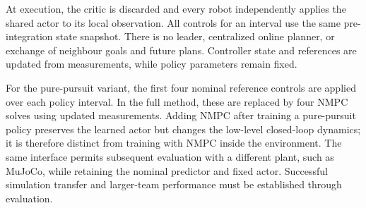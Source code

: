 At execution, the critic is discarded and every robot independently applies
the shared actor to its local observation. All controls for an interval use
the same pre-integration state snapshot. There is no leader, centralized
online planner, or exchange of neighbour goals and future plans. Controller
state and references are updated from measurements, while policy parameters
remain fixed.

For the pure-pursuit variant, the first four nominal reference controls are
applied over each policy interval. In the full method, these are replaced by
four NMPC solves using updated measurements. Adding NMPC after training a
pure-pursuit policy preserves the learned actor but changes the low-level
closed-loop dynamics; it is therefore distinct from training with NMPC inside
the environment. The same interface permits subsequent evaluation with a
different plant, such as MuJoCo, while retaining the nominal predictor and
fixed actor. Successful simulation transfer and larger-team performance must
be established through evaluation.
